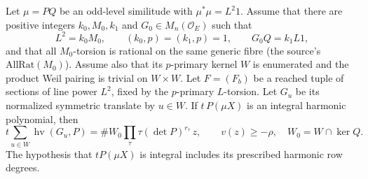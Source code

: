 \begin{srlemma}
\label{lem:ftb-primary-trace}
Let \(\mu=PQ\) be an odd-level similitude with
\(\mu^*\mu=L^2 1\).
Assume that there are positive integers \(k_0,M_0,k_1\) and
\(G_0\in M_n(\mathcal O_E)\) such that
\[
 L^2=k_0M_0,\qquad (k_0,p)=(k_1,p)=1,\qquad
 G_0Q=k_1L1,
\]
and that all \(M_0\)-torsion is rational on the same generic fibre
(the source's \(\mathrm{AllRat}(M_0)\)).
Assume also that its \(p\)-primary kernel \(W\) is enumerated and
the product Weil pairing is trivial on \(W\times W\).
Let \(F=(F_b)\) be a reached tuple of sections of line power \(L^2\),
fixed by the \(p\)-primary \(L\)-torsion.
Let \(G_u\) be its normalized symmetric translate by \(u\in W\).
If \(t\,P(\mu X)\) is an integral harmonic polynomial, then
\[
 t\sum_{u\in W}\operatorname{hv}(G_u,P)
   =\#W_0\prod_\tau\tau(\det P)^{r_\tau}\,z,\qquad
                         v(z)\ge-\rho ,
 \quad W_0=W\cap\ker Q .
\]
The hypothesis that \(tP(\mu X)\) is integral includes its
prescribed harmonic row degrees.
\end{srlemma}
